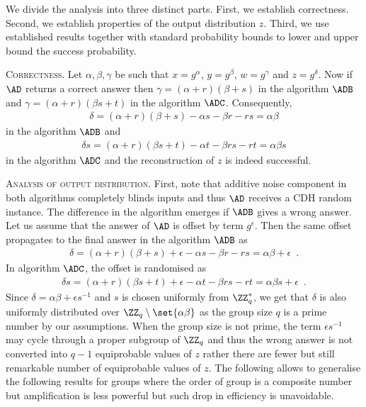 \documentclass{crypto-exercise}
\begin{document}
\begin{solution}
We divide the analysis into three distinct parts. First, we establish correctness. Second, we establish properties of the output distribution $z$. Third, we use established results together with standard probability bounds to lower and upper bound the success probability.

\vspace*{2ex}
\noindent\textsc{Correctness.}
Let $\alpha,\beta,\gamma$ be such that $x=g^\alpha$, $y=g^\beta$, $w=g^\gamma$ and $z=g^\delta$. 
Now if $\AD$ returns a correct answer then $\gamma=(\alpha+r)(\beta+s)$
in the algorithm $\ADB$ and $\gamma=(\alpha+r)(\beta s + t)$ in the algorithm $\ADC$. Consequently, 
\begin{align*}
\delta=(\alpha+r)(\beta+s) - \alpha s -\beta r-rs=\alpha\beta
\end{align*}  
in the algorithm $\ADB$ and
\begin{align*}
\delta s=(\alpha+r)(\beta s + t) - \alpha t -\beta rs -rt=\alpha\beta s
\end{align*} 
in the algorithm $\ADC$ and the reconstruction of $z$ is indeed successful.

\vspace*{2ex}
\noindent\textsc{Analysis of output distribution.}
First, note that additive noise component in both algorithms completely blinds inputs and thus $\AD$ receives a CDH random instance. 
The difference in the algorithm emerges if $\ADB$ gives a wrong answer. 
Let us assume that the answer of $\AD$ is offset by term $g^\epsilon$. Then the same offset propagates to the final answer in the algorithm $\ADB$ as
\begin{align*}
\delta=(\alpha+r)(\beta+s) + \epsilon - \alpha s -\beta r-rs=\alpha\beta + \epsilon\enspace.
\end{align*}  
In algorithm $\ADC$, the offset is randomised as  
\begin{align*}
\delta s=(\alpha+r)(\beta s + t) + \epsilon - \alpha t -\beta rs -rt=\alpha\beta s + \epsilon\enspace.
\end{align*} 
Since $\delta = \alpha\beta + \epsilon s^{-1}$ and $s$ is chosen uniformly from $\ZZ_q^*$, we get that $\delta$ is also uniformly distributed over $\ZZ_q\setminus\set{\alpha\beta}$ as the group size $q$ is a prime number by our assumptions. 
When the group size is not prime, the term $\epsilon s^{-1}$ may cycle through a proper subgroup of $\ZZ_q$ and thus the wrong answer is not converted into $q-1$ equiprobable values of $z$ rather there are fewer but still remarkable number of equiprobable values of $z$. 
The following allows to generalise the following results for groups where the order of group is a composite number but amplification is less powerful but such drop in efficiency is unavoidable.   



\end{solution}
\end{document}
